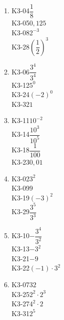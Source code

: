 \documentclass[11pt,a4paper]{article}
\begin{document}
\begin{enumerate}[leftmargin=1.6em, itemsep=0.7em]
\item \begin{minipage}[t]{\linewidth}\textsf{\small K3-04}\quad $\dfrac{1}{8}$ \\ \textsf{\small K3-05}\quad $0{,}125$ \\ \textsf{\small K3-08}\quad $2^{-3}$ \\ \textsf{\small K3-28}\quad $\left(\dfrac{1}{2}\right)^3$\end{minipage}
\item \begin{minipage}[t]{\linewidth}\textsf{\small K3-06}\quad $\dfrac{3^4}{3^4}$ \\ \textsf{\small K3-12}\quad $5^0$ \\ \textsf{\small K3-24}\quad $(-2)^0$ \\ \textsf{\small K3-32}\quad $1$\end{minipage}
\item \begin{minipage}[t]{\linewidth}\textsf{\small K3-11}\quad $10^{-2}$ \\ \textsf{\small K3-14}\quad $\dfrac{10^3}{10^5}$ \\ \textsf{\small K3-18}\quad $\dfrac{1}{100}$ \\ \textsf{\small K3-23}\quad $0{,}01$\end{minipage}
\item \begin{minipage}[t]{\linewidth}\textsf{\small K3-02}\quad $3^2$ \\ \textsf{\small K3-09}\quad $9$ \\ \textsf{\small K3-19}\quad $(-3)^2$ \\ \textsf{\small K3-29}\quad $\dfrac{3^5}{3^3}$\end{minipage}
\item \begin{minipage}[t]{\linewidth}\textsf{\small K3-10}\quad $-\dfrac{3^4}{3^2}$ \\ \textsf{\small K3-13}\quad $-3^2$ \\ \textsf{\small K3-21}\quad $-9$ \\ \textsf{\small K3-22}\quad $(-1) \cdot 3^2$\end{minipage}
\item \begin{minipage}[t]{\linewidth}\textsf{\small K3-07}\quad $32$ \\ \textsf{\small K3-25}\quad $2^2 \cdot 2^3$ \\ \textsf{\small K3-27}\quad $4^2 \cdot 2$ \\ \textsf{\small K3-31}\quad $2^5$\end{minipage}

\end{enumerate}
\end{document}

